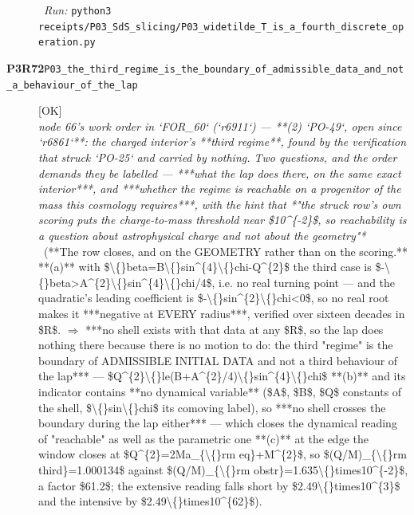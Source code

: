 \begin{description}
\ \emph{Run:} \texttt{python3 receipts/P03\_SdS\_slicing/P03\_widetilde\_T\_is\_a\_fourth\_discrete\_operation.py}
\item[\rcptlabel{P03_the_third_regime_is_the_boundary_of_admissible_data_and_not_a_behaviour_of_the_lap}{P3R72}\textbf{P3R72}\quad\texttt{P03\_the\_third\_regime\_is\_the\_boundary\_of\_admissible\_data\_and\_not\_a\_behaviour\_of\_the\_lap}]\hfill\textsf{[OK]}\\
\textit{node 66's work order in `FOR\_60` (`r6911`) --- **(2) `PO-49`, open since `r6861`**: the charged interior's **third regime**, found by the verification that struck `PO-25` and carried by nothing. Two questions, and the order demands they be labelled --- ***what the lap does there, on the same exact interior***, and ***whether the regime is reachable on a progenitor of the mass this cosmology requires***, with the hint that *"the struck row's own scoring puts the charge-to-mass threshold near \$10\textasciicircum{}\{-2\}\$, so reachability is a question about astrophysical charge and not about the geometry"*} \ (**The row closes, and on the GEOMETRY rather than on the scoring.**  **(a)** with \$\textbackslash\{\}beta=B\textbackslash\{\}sin\textasciicircum{}\{4\}\textbackslash\{\}chi-Q\textasciicircum{}\{2\}\$ the third case is \$-\textbackslash\{\}beta>A\textasciicircum{}\{2\}\textbackslash\{\}sin\textasciicircum{}\{4\}\textbackslash\{\}chi/4\$, i.e. no real turning point --- and the quadratic's leading coefficient is \$-\textbackslash\{\}sin\textasciicircum{}\{2\}\textbackslash\{\}chi<0\$, so no real root makes it ***negative at EVERY radius***, verified over sixteen decades in \$R\$. \ensuremath{\Rightarrow}  ***no shell exists with that data at any \$R\$, so the lap does nothing there because there is no motion to do: the third "regime" is the boundary of ADMISSIBLE INITIAL DATA and not a third behaviour of the lap*** --- \$Q\textasciicircum{}\{2\}\textbackslash\{\}le(B+A\textasciicircum{}\{2\}/4)\textbackslash\{\}sin\textasciicircum{}\{4\}\textbackslash\{\}chi\$  **(b)** and its indicator contains **no dynamical variable** (\$A\$, \$B\$, \$Q\$ constants of the shell, \$\textbackslash\{\}sin\textbackslash\{\}chi\$ its comoving label), so ***no shell crosses the boundary during the lap either*** --- which closes the dynamical reading of "reachable" as well as the parametric one  **(c)** at the edge the window closes at \$Q\textasciicircum{}\{2\}=2Ma\_\{\textbackslash\{\}rm eq\}+M\textasciicircum{}\{2\}\$, so \$(Q/M)\_\{\textbackslash\{\}rm third\}=1.000134\$ against \$(Q/M)\_\{\textbackslash\{\}rm obstr\}=1.635\textbackslash\{\}times10\textasciicircum{}\{-2\}\$, a factor \$61.2\$; the extensive reading falls short by \$2.49\textbackslash\{\}times10\textasciicircum{}\{3\}\$ and the intensive by \$2.49\textbackslash\{\}times10\textasciicircum{}\{62\}\$). 

\end{description}
